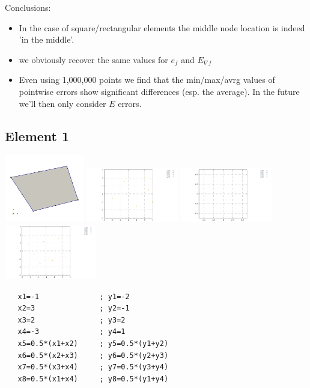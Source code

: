 Conclusions:
\begin{itemize}
\item In the case of square/rectangular elements the middle node
location is indeed 'in the middle'.
\item we obviously recover the same values for $e_f$ and $E_{\nabla f}$
\item Even using 1,000,000 points we find that the min/max/avrg values
of pointwise errors show significant differences (esp. the average). 
In the future we'll then only consider $E$ errors. 
\end{itemize}




\newpage
\subsection*{Element 1}
\begin{center}
\includegraphics[width=3.5cm]{images/mappings/biquadratic3/elt1/element1}
\includegraphics[width=4cm]{images/mappings/biquadratic3/elt1/nodes}
\includegraphics[width=4cm]{images/mappings/biquadratic3/elt1/nodes_zoom}
\includegraphics[width=4cm]{images/mappings/biquadratic3/elt1/quad_points}
\end{center}
\begin{lstlisting}
   x1=-1              ; y1=-2
   x2=3               ; y2=-1
   x3=2               ; y3=2
   x4=-3              ; y4=1
   x5=0.5*(x1+x2)     ; y5=0.5*(y1+y2)
   x6=0.5*(x2+x3)     ; y6=0.5*(y2+y3)
   x7=0.5*(x3+x4)     ; y7=0.5*(y3+y4)
   x8=0.5*(x1+x4)     ; y8=0.5*(y1+y4)
\end{lstlisting}

